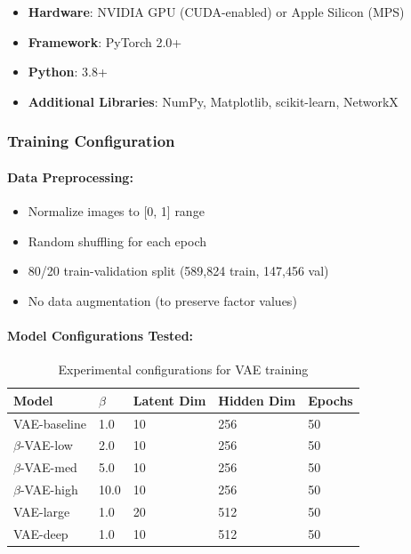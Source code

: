 \documentclass[conference]{IEEEtran}
\begin{document}
\begin{itemize}
    \item \textbf{Hardware}: NVIDIA GPU (CUDA-enabled) or Apple Silicon (MPS)
    \item \textbf{Framework}: PyTorch 2.0+
    \item \textbf{Python}: 3.8+
    \item \textbf{Additional Libraries}: NumPy, Matplotlib, scikit-learn, NetworkX
\end{itemize}

\subsubsection{Training Configuration}

\paragraph{Data Preprocessing:}
\begin{itemize}
    \item Normalize images to [0, 1] range
    \item Random shuffling for each epoch
    \item 80/20 train-validation split (589,824 train, 147,456 val)
    \item No data augmentation (to preserve factor values)
\end{itemize}

\paragraph{Model Configurations Tested:}
\begin{table}[!t]
\centering
\begin{tabular}{@{}lllll@{}}
\toprule
\textbf{Model} & \textbf{$\beta$} & \textbf{Latent Dim} & \textbf{Hidden Dim} & \textbf{Epochs} \\ \midrule
VAE-baseline & 1.0 & 10 & 256 & 50 \\
$\beta$-VAE-low & 2.0 & 10 & 256 & 50 \\
$\beta$-VAE-med & 5.0 & 10 & 256 & 50 \\
$\beta$-VAE-high & 10.0 & 10 & 256 & 50 \\
VAE-large & 1.0 & 20 & 512 & 50 \\
VAE-deep & 1.0 & 10 & 512 & 50 \\ \bottomrule
\end{tabular}
\caption{Experimental configurations for VAE training}
\label{tab:experiments}
\end{table}
\end{document}
